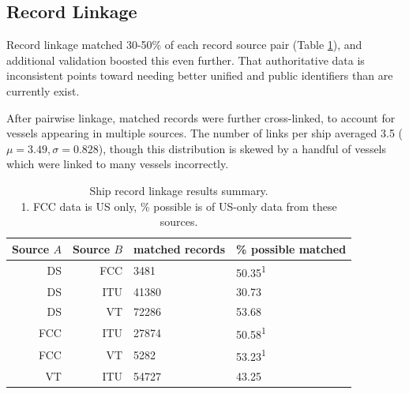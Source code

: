 \documentclass[12pt,letterpaper]{article}
\begin{document}


\subsection{Record Linkage}

Record linkage matched 30-50\% of each record source pair (Table \ref{table:ships-record-linkage-results-summary}), and additional validation boosted this even further. That authoritative data is inconsistent points toward needing better unified and public identifiers than are currently exist.

After pairwise linkage, matched records were further cross-linked, %
 to account for vessels appearing in multiple sources. The number of links per ship averaged 3.5 ($\mu = 3.49, \sigma = 0.828$), %
though this distribution is skewed by a handful of vessels which were linked to many vessels incorrectly. 
\begin{table}[htbp]
  \begin{tabular}{rrll} %
    \hline
    Source $A$ & Source $B$ & matched records & \% possible matched \\
    \hline
     DS & FCC &  3481 & 50.35\textsuperscript{1} \\
     DS & ITU & 41380 & 30.73 \\
     DS &  VT & 72286 & 53.68 \\
    FCC & ITU & 27874 & 50.58\textsuperscript{1} \\
    FCC &  VT &  5282 & 53.23\textsuperscript{1} \\
     VT & ITU & 54727 & 43.25 \\
  \end{tabular}
  \caption{Ship record linkage results summary. \\
    1. FCC data is US only, \% possible is of US-only data from these sources.}
  \label{table:ships-record-linkage-results-summary}
\end{table}
\end{document}
